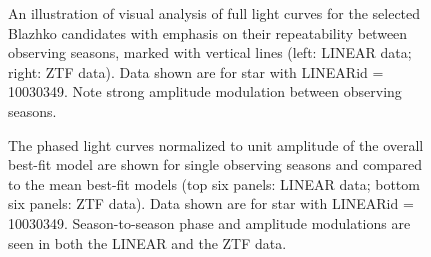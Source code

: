 \begin{figure}[ht] 
    \centering
       \caption{An illustration of visual analysis of full light curves for the selected Blazhko candidates with emphasis
         on their repeatability between observing seasons, marked with  vertical lines (left: LINEAR data; right: ZTF data). Data
         shown are for star with LINEARid = 10030349. Note strong
         amplitude modulation between observing seasons.}
         \label{fig:phase3}
\end{figure}
       
\begin{figure}[ht]
    \centering
    \caption{The phased light curves normalized to unit amplitude of
      the overall best-fit model are shown for single observing seasons
      and compared to the mean best-fit models (top six panels: LINEAR data; bottom six panels: ZTF data).
      Data shown are for star with LINEARid = 10030349.
      Season-to-season phase and amplitude modulations are seen in both the LINEAR and the ZTF data.}
      \label{fig:phase4}
\end{figure}



